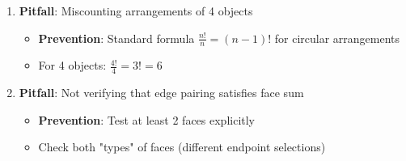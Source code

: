 \documentclass[]{article}
\begin{document}
\begin{solutionbox}
\begin{enumerate}[leftmargin=*]
    \item \textbf{Pitfall}: Miscounting arrangements of 4 objects
    \begin{itemize}
        \item \textbf{Prevention}: Standard formula $\frac{n!}{n} = (n-1)!$ for circular arrangements
        \item For 4 objects: $\frac{4!}{4} = 3! = 6$
    \end{itemize}
    
    \item \textbf{Pitfall}: Not verifying that edge pairing satisfies face sum
    \begin{itemize}
        \item \textbf{Prevention}: Test at least 2 faces explicitly
        \item Check both "types" of faces (different endpoint selections)
    \end{itemize}
\end{enumerate}
\end{solutionbox}
\end{document}
